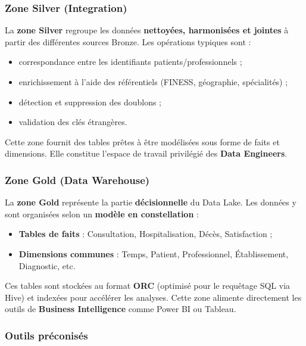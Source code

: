 \documentclass[12pt,a4paper]{article}
\begin{document}
\subsubsection{Zone Silver (Integration)}

La \textbf{zone Silver} regroupe les données \textbf{nettoyées, harmonisées et jointes} à partir des différentes sources Bronze.
Les opérations typiques sont :

\begin{itemize}[leftmargin=*]
    \item correspondance entre les identifiants patients/professionnels ;
    \item enrichissement à l'aide des référentiels (FINESS, géographie, spécialités) ;
    \item détection et suppression des doublons ;
    \item validation des clés étrangères.
\end{itemize}

Cette zone fournit des tables prêtes à être modélisées sous forme de faits et dimensions. Elle constitue l'espace de travail privilégié des \textbf{Data Engineers}.

\subsubsection{Zone Gold (Data Warehouse)}

La \textbf{zone Gold} représente la partie \textbf{décisionnelle} du Data Lake.
Les données y sont organisées selon un \textbf{modèle en constellation} :

\begin{itemize}[leftmargin=*]
    \item \textbf{Tables de faits} : Consultation, Hospitalisation, Décès, Satisfaction ;
    \item \textbf{Dimensions communes} : Temps, Patient, Professionnel, Établissement, Diagnostic, etc.
\end{itemize}

Ces tables sont stockées au format \textbf{ORC} (optimisé pour le requêtage SQL via Hive) et indexées pour accélérer les analyses.
Cette zone alimente directement les outils de \textbf{Business Intelligence} comme Power BI ou Tableau.

\subsubsection{Outils préconisés}
\end{document}
